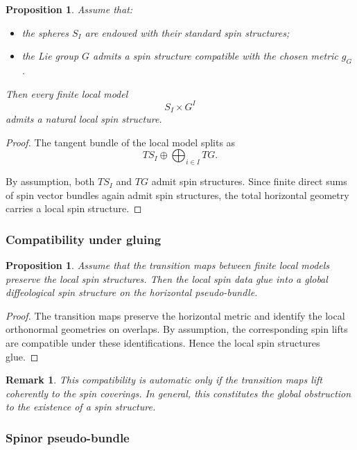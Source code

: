 \documentclass[11pt]{amsart}
\newtheorem{proposition}[theorem]{Proposition}
\newtheorem{remark}[theorem]{Remark}
\begin{document}
\begin{proposition}
Assume that:
\begin{itemize}
\item the spheres \(S_I\) are endowed with their standard spin structures;
\item the Lie group \(G\) admits a spin structure compatible with the chosen
metric \(g_G\).
\end{itemize}
Then every finite local model
\[
S_I\times G^I
\]
admits a natural local spin structure.
\end{proposition}

\begin{proof}
The tangent bundle of the local model splits as
\[
TS_I
\oplus
\bigoplus_{i\in I}TG.
\]

By assumption, both \(TS_I\) and \(TG\) admit spin structures. Since finite
direct sums of spin vector bundles again admit spin structures, the total
horizontal geometry carries a local spin structure.
\end{proof}

\subsubsection{Compatibility under gluing}

\begin{proposition}
Assume that the transition maps between finite local models preserve the local
spin structures. Then the local spin data glue into a global diffeological
spin structure on the horizontal pseudo-bundle.
\end{proposition}

\begin{proof}
The transition maps preserve the horizontal metric and identify the local
orthonormal geometries on overlaps. By assumption, the corresponding spin
lifts are compatible under these identifications. Hence the local spin
structures glue.
\end{proof}

\begin{remark}
This compatibility is automatic only if the transition maps lift coherently to
the spin coverings. In general, this constitutes the global obstruction to the
existence of a spin structure.
\end{remark}

\subsubsection{Spinor pseudo-bundle}
\end{document}

